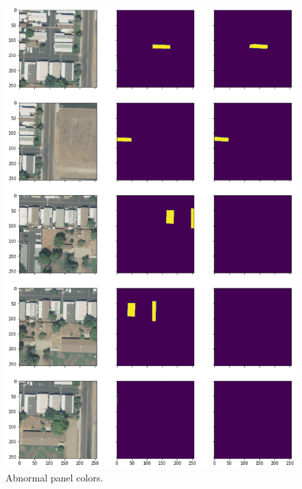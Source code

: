 \documentclass[a4paper, 12pt]{article}
\begin{document}
	\begin{figure}[H]
	    \centering
	    \includegraphics[height=0.92\textheight]{resources/png/bad_color.png}
	    \caption{Abnormal panel colors.}
	\end{figure}
	
\end{document}
